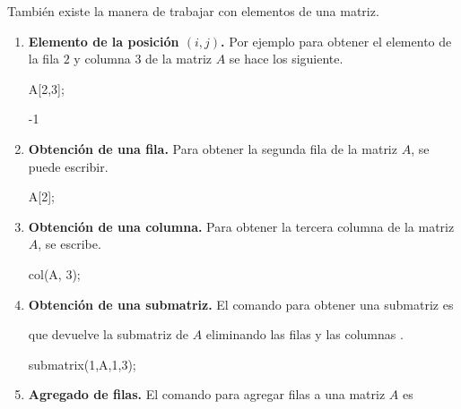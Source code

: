 También existe la manera de trabajar con elementos de
una matriz.
\begin{enumerate}
 \item \textbf{Elemento de la posición $(i,j)$.} Por ejemplo para
  obtener el elemento de la fila $2$ y columna $3$ de la matriz $A$
  se hace los siguiente.
  \begin{maximai}
   A[2,3];
  \end{maximai}\begin{maximao}
   -1
  \end{maximao}
 \item \textbf{Obtención de una fila.} Para obtener la segunda fila
  de la matriz $A$, se puede escribir.
  \begin{maximai}
   A[2];
  \end{maximai}\begin{maximao}
   \left[ 3 , 0 , -1 \right]
  \end{maximao}
 \item \textbf{Obtención de una columna.} Para obtener la tercera
  columna de la matriz $A$, se escribe.
  \begin{maximai}
   col(A, 3);
  \end{maximai}\begin{maximao}
   \ifx\endpmatrix\undefined\pmatrix{\else\begin{pmatrix}\fi 3\cr -1
   \cr 1\cr \ifx\endpmatrix\undefined}\else\end{pmatrix}\fi
  \end{maximao}
 \item \textbf{Obtención de una submatriz.} El comando para obtener
  una submatriz es
  \begin{center}
  \end{center}
  que devuelve la submatriz de $A$ eliminando las filas
   y las columnas .
  \begin{maximai}
   submatrix(1,A,1,3);
  \end{maximai}\begin{maximao}
   \ifx\endpmatrix\undefined\pmatrix{\else\begin{pmatrix}\fi 0\cr 2
   \cr \ifx\endpmatrix\undefined}\else\end{pmatrix}\fi
  \end{maximao}
 \item \textbf{Agregado de filas.} El comando para agregar filas a
  una matriz $A$ es
  \begin{center}

\end{center}
\end{enumerate}
